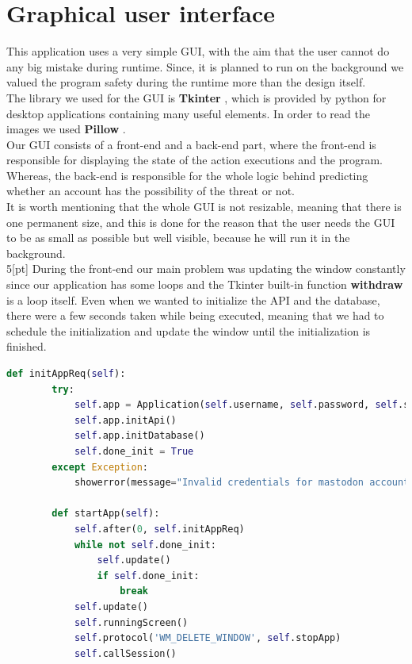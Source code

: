 \section{Graphical user interface}
This application uses a very simple GUI, with the aim that the user cannot do any big mistake during runtime.
Since, it is planned to run on the background we valued the program safety during the runtime more than the design
itself.
\\[5pt]
The library we used for the GUI is \textbf{Tkinter} \cite{tkinter}, which is provided by python for desktop applications containing many
useful elements. In order to read the images we used \textbf{Pillow} \cite{pil}.
\\[5pt]
Our GUI consists of a front-end and a back-end part, where the front-end is responsible for displaying the state of the action
executions and the program. Whereas, the back-end is responsible for the whole logic behind predicting whether an account has
the possibility of the threat or not.
\\[5pt]
It is worth mentioning that the whole GUI is not resizable, meaning that there is one permanent size, and this is done for the reason
that the user needs the GUI to be as small as possible but well visible, because he will run it in the background.
\\5[pt]
During the front-end our main problem was updating the window constantly since our application has some loops and the Tkinter
built-in function \textbf{withdraw} is a loop itself. Even when we wanted to initialize the API and the database, there were a few
seconds taken while being executed, meaning that we had to schedule the initialization and update the window until the initialization
is finished. 
\\[5pt]
\begin{lstlisting}[language=python, caption={Updating window while initializing the API and database}, captionpos=b]
	def initAppReq(self):
		try:
			self.app = Application(self.username, self.password, self.server)
			self.app.initApi()
			self.app.initDatabase()
			self.done_init = True
		except Exception:
			showerror(message="Invalid credentials for mastodon account")
		
		def startApp(self):
			self.after(0, self.initAppReq)
			while not self.done_init:
				self.update()
				if self.done_init:
					break
			self.update()
			self.runningScreen()
			self.protocol('WM_DELETE_WINDOW', self.stopApp)
			self.callSession()
	
\end{lstlisting}
